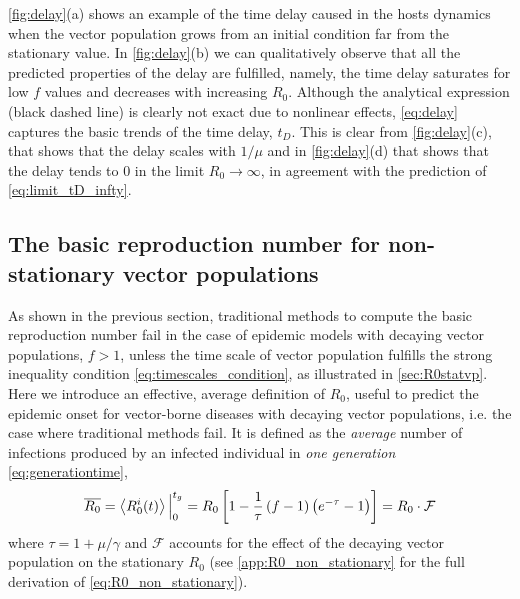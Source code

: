 \cref{fig:delay}(a) shows an example of the time delay caused in the hosts
dynamics when the vector population grows from an initial condition far from
the stationary value. In \cref{fig:delay}(b) we can qualitatively observe that
all the predicted properties of the delay are fulfilled, namely, the time delay
saturates for low $f$ values and decreases with increasing $R_0$. Although the
analytical expression (black dashed line) is clearly not exact due to nonlinear
effects, \cref{eq:delay} captures the basic trends of the time delay, $t_D$.
This is clear from \cref{fig:delay}(c), that shows that the delay scales with
$1/\mu$ and in \cref{fig:delay}(d) that shows that the delay tends to $0$ in
the limit $R_0\rightarrow\infty$, in agreement with the prediction of
\cref{eq:limit_tD_infty}.

\subsection{The basic reproduction number for non-stationary vector
    populations}

As shown in the previous section, traditional methods to compute the basic
reproduction number fail in the case of epidemic models with decaying vector
populations, $f>1$, unless the time scale of vector population fulfills the
strong inequality condition \cref{eq:timescales_condition}, as illustrated in
\cref{sec:R0statvp}. Here we introduce an effective, average definition of
$R_0$, useful to predict the epidemic onset for vector-borne diseases with
decaying vector populations, i.e. the case where traditional methods fail. It
is defined as the \textit{average} number of infections produced by an infected
individual in \textit{one generation} \cref{eq:generationtime},
\begin{equation}\label{eq:R0_non_stationary}
    \overline{R_0}=\left<R_{0}^{i}(t)\right>\Big\rvert_{0}^{t_g}=
    R_0\left[1-\frac{1}{\tau}\left(f-1\right)
        \left(e^{-\tau}-1\right)\right]=R_0\cdot\mathcal{F}
\end{equation}
where $\tau=1+\mu/\gamma$ and $\mathcal{F}$ accounts for the effect of the
decaying vector population on the stationary $R_0$ (see
\cref{app:R0_non_stationary} for the full derivation of
\cref{eq:R0_non_stationary}).

